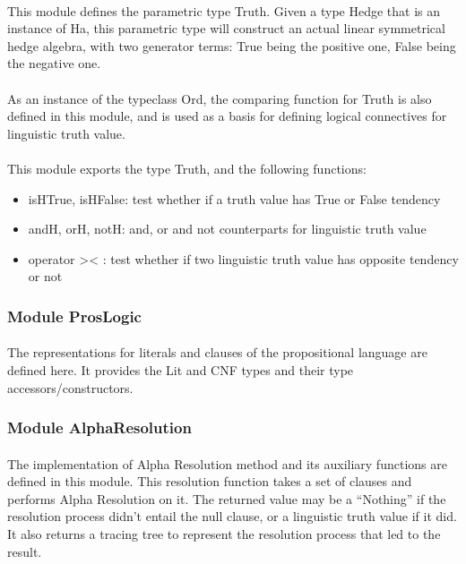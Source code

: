 \documentclass[../gr-final.tex]{subfiles}
\begin{document}
\paragraph{}This module defines the parametric type Truth. Given
a type Hedge that is an instance of Ha, this parametric type will
construct an actual linear symmetrical hedge algebra, with two
generator terms: True being the positive one, False being the negative
one.
\paragraph{}As an instance of the typeclass Ord, the comparing
function for Truth is also defined in this module, and is used as
a basis for defining logical connectives for linguistic truth
value.
\paragraph{} This module exports the type Truth, and the following functions:

\begin{itemize}
\item isHTrue, isHFalse: test whether if a truth value has True or
  False tendency 
\item andH, orH, notH: and, or and not counterparts for
  linguistic truth value 
\item operator >< : test whether if two linguistic
  truth value has opposite tendency or not
\end{itemize}


\subsubsection{Module ProsLogic}

\paragraph{}The representations for literals and clauses of the
propositional language are defined here. It provides the Lit and CNF types and their type accessors/constructors. 


\subsubsection{Module AlphaResolution}

\paragraph{}The implementation of Alpha Resolution method and its
auxiliary functions are defined in this module. This resolution
function takes a set of clauses and performs Alpha Resolution on
it. The returned value may be a ``Nothing'' if the resolution process didn't entail
the null clause, or a linguistic truth value if it did. It also returns a tracing
tree to represent the resolution process that led to the result.
\end{document}
